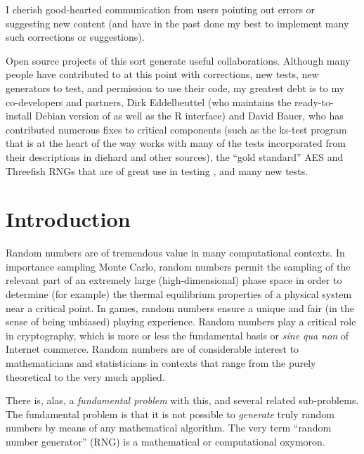 \documentclass{book}
\begin{document}
I cherish good-hearted communication from \die users pointing out errors
or suggesting new content (and have in the past done my best to
implement many such corrections or suggestions).

Open source projects of this sort generate useful collaborations.
Although many people have contributed to \die at this point with
corrections, new tests, new generators to test, and permission to use
their code, my greatest debt is to my co-developers and partners, Dirk
Eddelbeuttel (who maintains the ready-to-install Debian version of
\die as well as the R interface) and David Bauer, who has
contributed numerous fixes to critical components (such as the ks-test
program that is at the heart of the way \die works with many of the
tests incorporated from their descriptions in diehard and other
sources), the ``gold standard'' AES and Threefish RNGs that are of great
use in testing \die, and many new tests.

\newpage

\tableofcontents

\newpage

\chapter{Introduction}

Random numbers are of tremendous value in many computational contexts.
In importance sampling Monte Carlo, random numbers permit the sampling
of the relevant part of an extremely large (high-dimensional) phase
space in order to determine (for example) the thermal equilibrium
properties of a physical system near a critical point.  In games, random
numbers ensure a unique and fair (in the sense of being unbiased)
playing experience.  Random numbers play a critical role in
cryptography, which is more or less the fundamental basis or {\em sine
qua non} of Internet commerce.  Random numbers are of considerable
interest to mathematicians and statisticians in contexts that range from
the purely theoretical to the very much applied.

There is, alas, a {\em fundamental problem} with this, and several
related sub-problems.  The fundamental problem is that it is not
possible to {\em generate} truly random numbers by means of any
mathematical algorithm.  The very term ``random number generator'' (RNG)
is a mathematical or computational oxymoron.  
\end{document}
